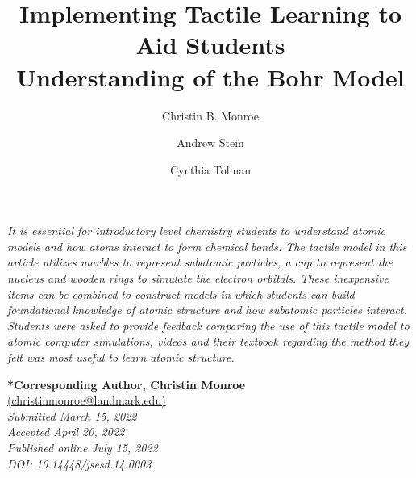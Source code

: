 \documentclass[11pt]{sig-alternate}
\makeatletter
\let\oldabstract\abstract
\let\oldendabstract\endabstract
\renewenvironment{abstract}
{\renewenvironment{quotation}%
               {\list{}{\addtolength{\leftmargin}{1em} %
                        \listparindent 1.5em%
                        \itemindent    \listparindent%
                        \rightmargin   \leftmargin%
                        \parsep        \z@ \@plus\p@}%
                \item\relax}%
               {\endlist}%
\oldabstract}
{\oldendabstract}
\makeatother
\begin{document}
\title{Implementing Tactile Learning to Aid Students \\Understanding of the Bohr Model}
\begin{large}
\author[1]{\large \color{blue} Christin B. Monroe}
\author[1]{\large \color{blue} Andrew Stein}
\author[1]{\large \color{blue} Cynthia Tolman}

\end{large}
\toappear{}

\maketitle
\begin{@twocolumnfalse} 

\begin{abstract}
    \begin{large}
     \textit{It is essential for introductory level chemistry students to understand atomic models and how atoms interact to form chemical bonds. The tactile model in this article utilizes marbles to represent subatomic particles, a cup to represent the nucleus and wooden rings to simulate the electron orbitals. These inexpensive items can be combined to construct models in which students can build foundational knowledge of atomic structure and how subatomic particles interact. Students were asked to provide feedback comparing the use of this tactile model to atomic computer simulations, videos and their textbook regarding the method they felt was most useful to learn atomic structure.}\\
    \end{large}
\end{abstract}
\end{@twocolumnfalse}




\textbf{*Corresponding Author, Christin Monroe}\\
\href{mailto:christinmonroe@landmark.edu}{(christinmonroe@landmark.edu)} \\
\textit{Submitted March 15, 2022 }\\
\textit{Accepted April 20, 2022} \\
\textit{Published online July 15, 2022} \\
\textit{DOI: 10.14448/jsesd.14.0003} \\


\pagebreak
\pagebreak

\vspace{5mm}
\end{document}
